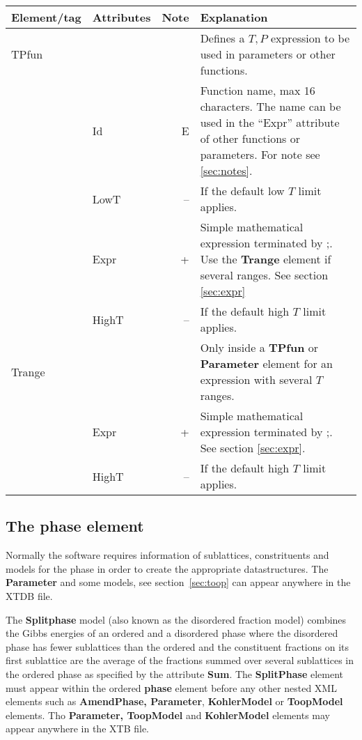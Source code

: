 \documentclass{article}
\begin{document}
\bigskip
\begin{tabular}{|p{} p{} r p{}|}\hline
  Element/tag & Attributes & Note & Explanation\\\hline

  TPfun & && Defines a $T, P$ expression to be used in parameters or other functions.\\
        & Id & E & Function name, max 16 characters. The name can be used in the ``Expr'' attribute of other functions or parameters.  For note see \ref{sec:notes}.\\
        & LowT & -- & If the default low $T$ limit applies.\\
        & Expr & + & Simple mathematical expression terminated by ;.   Use the {\bf Trange} element if several ranges.  See section \ref{sec:expr}\\
        & HighT & -- & If the default high $T$ limit applies.\\\hline

  Trange & && Only inside a {\bf TPfun} or {\bf Parameter} element for an expression with several $T$ ranges.\\ 
         & Expr & + & Simple mathematical expression terminated by ;.  See section \ref{sec:expr}.\\
         & HighT & -- & If the default high $T$ limit applies.\\\hline
\end{tabular}

\subsection{The phase element}\label{sec:phase}

Normally the software requires information of sublattices,
constrituents and models for the phase in order to create the
appropriate datastructures.  The {\bf Parameter} and some models, see
section~\ref{sec:toop} can appear anywhere in the XTDB file.

The {\bf Splitphase} model (also known as the disordered fraction
model) combines the Gibbs energies of an ordered and a disordered
phase where the disordered phase has fewer sublattices than the
ordered and the constituent fractions on its first sublattice are the
average of the fractions summed over several sublattices in the
ordered phase as specified by the attribute {\bf Sum}.  The {\bf
  SplitPhase} element must appear within the ordered {\bf phase}
element before any other nested XML elements such as {\bf AmendPhase,
  Parameter}, {\bf KohlerModel} or {\bf ToopModel} elements.  Tho {\bf
  Parameter, ToopModel} and {\bf KohlerModel} elements may appear anywhere in
the XTB file.
\end{document}
